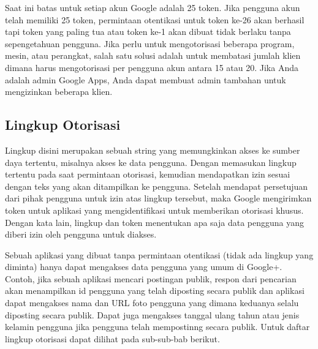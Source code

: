Saat ini batas untuk setiap akun Google adalah 25 token. Jika pengguna akun telah memiliki 25 token, permintaan otentikasi untuk token ke-26 akan berhasil tapi token yang paling tua atau token ke-1 akan dibuat tidak berlaku tanpa sepengetahuan pengguna.
Jika perlu untuk mengotorisasi beberapa program, mesin, atau perangkat, salah satu solusi adalah untuk membatasi jumlah klien dimana harus mengotorisasi per pengguna akun antara 15 atau 20. Jika Anda adalah admin Google Apps, Anda dapat membuat admin tambahan untuk mengizinkan beberapa klien.

\subsection{Lingkup Otorisasi \cite{Scope:2013}}
Lingkup disini merupakan sebuah string yang memungkinkan akses ke sumber daya tertentu, misalnya akses ke data pengguna. Dengan memasukan lingkup tertentu pada saat permintaan otorisasi, kemudian mendapatkan izin sesuai dengan teks yang akan ditampilkan ke pengguna. Setelah mendapat persetujuan dari pihak pengguna untuk izin atas lingkup tersebut, maka Google mengirimkan token untuk aplikasi yang mengidentifikasi untuk memberikan otorisasi khusus. Dengan kata lain, lingkup dan token menentukan apa saja data pengguna yang diberi izin oleh pengguna untuk diakses.

Sebuah aplikasi yang dibuat tanpa permintaan otentikasi (tidak ada lingkup yang diminta) hanya dapat mengakses data pengguna yang umum di Google+. Contoh, jika sebuah aplikasi mencari postingan publik, respon dari pencarian akan menampilkan id pengguna yang telah diposting secara publik dan aplikasi dapat mengakses nama dan URL foto pengguna yang dimana keduanya selalu diposting secara publik. Dapat juga mengakses tanggal ulang tahun atau jenis kelamin pengguna jika pengguna telah mempostinng secara publik. Untuk daftar lingkup otorisasi dapat dilihat pada sub-sub-bab berikut.

